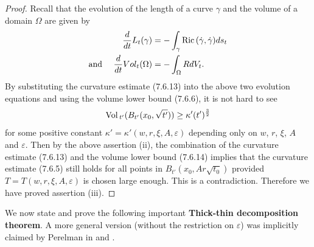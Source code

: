 \begin{proof}
Recall that the evolution of the length of a curve $\gamma$ and
the volume of a domain $\Omega$ are given by
\begin{align*}
\frac{d}{dt}L_t(\gamma)
&=-\int_{\gamma}{\rm Ric}\,(\dot{\gamma},\dot{\gamma})ds_t \\
\mbox{and } \quad \frac{d}{dt}Vol_t(\Omega) &=-\int_{\Omega}RdV_t.
\end{align*}
By substituting the curvature estimate (7.6.13) into the above two
evolution equations and using the volume lower bound (7.6.6), it
is not hard to see \begin{equation} \Vol_{t'}(B_{t'}(x_0,\sqrt{t'}))\geq
 \kappa'(t')^{\frac{3}{2}} %
\end{equation} for some positive constant
$\kappa'=\kappa'(w,r,\xi,A,\varepsilon)$ depending only on $w$,
$r$, $\xi$, $A$ and $\varepsilon$. Then by the above assertion
(ii), the combination of the curvature estimate (7.6.13) and the
volume lower bound (7.6.14) implies that the curvature estimate
(7.6.5) still holds for all points in $B_{t'}(x_0,Ar\sqrt{t_0})$
provided $T=T(w,r,\xi,A,\varepsilon)$ is chosen large enough. This
is a contradiction.  Therefore we have proved assertion (iii).
\end{proof}

We now state and prove the following important \textbf{Thick-thin
decomposition theorem}. A
more general version (without the restriction on $\varepsilon$)
was implicitly claimed by Perelman in \cite{P1} and \cite{P2}.


